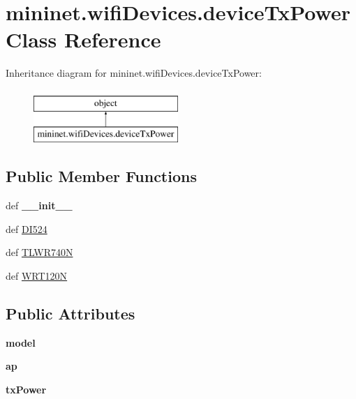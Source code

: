 \hypertarget{classmininet_1_1wifiDevices_1_1deviceTxPower}{\section{mininet.\-wifi\-Devices.\-device\-Tx\-Power Class Reference}
\label{classmininet_1_1wifiDevices_1_1deviceTxPower}
}
Inheritance diagram for mininet.\-wifi\-Devices.\-device\-Tx\-Power\-:\begin{figure}[H]
\begin{center}
\leavevmode
\includegraphics[height=2.000000cm]{classmininet_1_1wifiDevices_1_1deviceTxPower}
\end{center}
\end{figure}
\subsection*{Public Member Functions}
\begin{DoxyCompactItemize}
\item 
\hypertarget{classmininet_1_1wifiDevices_1_1deviceTxPower_a158221f123f7c7fa896ec98d5ef96156}{def {\bfseries \-\_\-\-\_\-init\-\_\-\-\_\-}}\label{classmininet_1_1wifiDevices_1_1deviceTxPower_a158221f123f7c7fa896ec98d5ef96156}

\item 
def \hyperlink{classmininet_1_1wifiDevices_1_1deviceTxPower_a923dbc3d5f6285872a5585b9bbb9603e}{D\-I524}
\item 
def \hyperlink{classmininet_1_1wifiDevices_1_1deviceTxPower_abefb1b3e723b0b13a7c32bd6bfa6fb42}{T\-L\-W\-R740\-N}
\item 
def \hyperlink{classmininet_1_1wifiDevices_1_1deviceTxPower_a33e3e8d506a790dcabac4d2bf2f6aa41}{W\-R\-T120\-N}
\end{DoxyCompactItemize}
\subsection*{Public Attributes}
\begin{DoxyCompactItemize}
\item 
\hypertarget{classmininet_1_1wifiDevices_1_1deviceTxPower_a3096d329e255f5b1bce363bb96a9103b}{{\bfseries model}}\label{classmininet_1_1wifiDevices_1_1deviceTxPower_a3096d329e255f5b1bce363bb96a9103b}

\item 
\hypertarget{classmininet_1_1wifiDevices_1_1deviceTxPower_a598b80138c60920fe32e25198c87ca5a}{{\bfseries ap}}\label{classmininet_1_1wifiDevices_1_1deviceTxPower_a598b80138c60920fe32e25198c87ca5a}

\item 
\hypertarget{classmininet_1_1wifiDevices_1_1deviceTxPower_a3ca46b384fc075c3e8d97eaba7eedf6e}{{\bfseries tx\-Power}}\label{classmininet_1_1wifiDevices_1_1deviceTxPower_a3ca46b384fc075c3e8d97eaba7eedf6e}

\end{DoxyCompactItemize}
